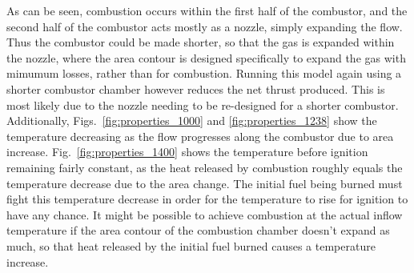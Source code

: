 \documentclass[a4paper]{article}
\begin{document}
As can be seen, combustion occurs within the first half of the combustor, and the second half of the combustor acts mostly as a nozzle, simply expanding the flow. Thus the combustor could be made shorter, so that the gas is expanded within the nozzle, where the area contour is designed specifically to expand the gas with mimumum losses, rather than for combustion. Running this model again using a shorter combustor chamber however reduces the net thrust produced. This is most likely due to the nozzle needing to be re-designed for a shorter combustor. Additionally, Figs.~\ref{fig:properties_1000} and \ref{fig:properties_1238} show the temperature decreasing as the flow progresses along the combustor due to area increase. Fig.~\ref{fig:properties_1400} shows the temperature before ignition remaining fairly constant, as the heat released by combustion roughly equals the temperature decrease due to the area change. The initial fuel being burned must fight this temperature decrease in order for the temperature to rise for ignition to have any chance. It might be possible to achieve combustion at the actual inflow temperature if the area contour of the combustion chamber doesn't expand as much, so that heat released by the initial fuel burned causes a temperature increase.
\end{document}
